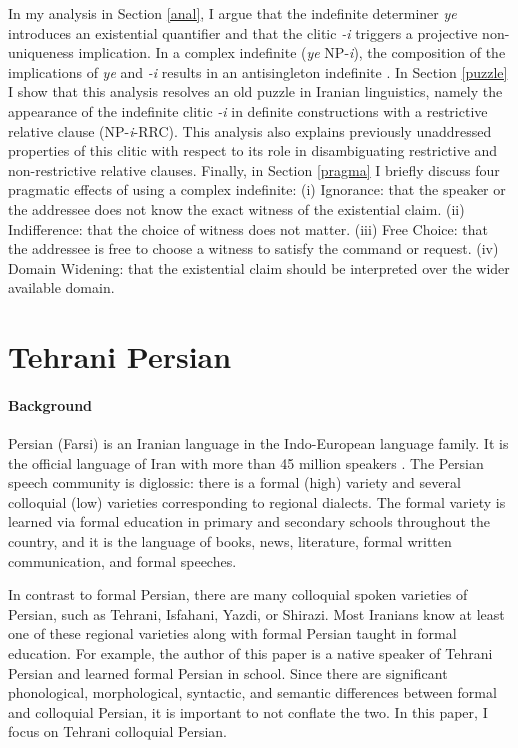 \documentclass{salt}
\begin{document}
In my analysis in Section \ref{anal}, I argue that the indefinite determiner \emph{ye} introduces an existential quantifier and that the clitic \emph{-i} triggers a projective non-uniqueness implication. In a complex indefinite (\emph{ye} NP-\emph{i}), the composition of the implications of \emph{ye} and \emph{-i} results in an antisingleton indefinite \citep{alonso2009modal}. In Section \ref{puzzle} I show that this analysis resolves an old puzzle in Iranian linguistics, namely the appearance of the indefinite clitic \emph{-i} in definite constructions with a restrictive relative clause (NP-\emph{i}-RRC). This analysis also explains previously unaddressed properties of this clitic with respect to its role in disambiguating restrictive and non-restrictive relative clauses. Finally, in Section \ref{pragma} I briefly discuss four pragmatic effects of using a complex indefinite: (i) Ignorance: that the speaker or the addressee does not know the exact witness of the existential claim. (ii) Indifference: that the choice of witness does not matter. (iii) Free Choice: that the addressee is free to choose a witness to satisfy the command or request. (iv) Domain Widening: that the existential claim should be interpreted over the wider available domain.  


\section {Tehrani Persian} \label {persian}

\paragraph {Background}
Persian (Farsi) is an Iranian language in the Indo-European language family. It is the official language of Iran with more than 45 million speakers \citep{wals2015}. The Persian speech community is diglossic: there is a formal (high) variety and several colloquial (low) varieties corresponding to regional dialects. The formal variety is learned via formal education in primary and secondary schools throughout the country, and it is the language of books, news, literature, formal written communication, and formal speeches. 

In contrast to formal Persian, there are many colloquial spoken varieties of Persian, such as Tehrani, Isfahani, Yazdi, or Shirazi. Most Iranians know at least one of these regional varieties along with formal Persian taught in formal education. For example, the author of this paper is a native speaker of Tehrani Persian and learned formal Persian in school. Since there are significant phonological, morphological, syntactic, and semantic differences between formal and colloquial Persian, it is important to not conflate the two. In this paper, I focus on Tehrani colloquial Persian.
\end{document}
